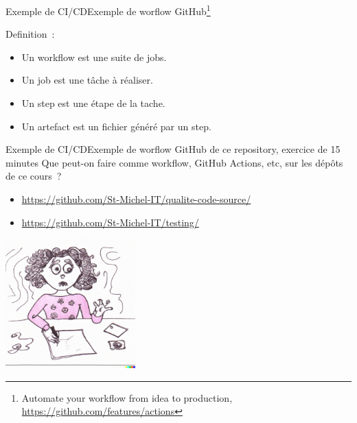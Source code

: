 \documentclass{beamer}
\begin{document}
    \begin{frame}{Exemple de CI/CD}{Exemple de worflow GitHub{\footnote{Automate your workflow from idea to production, \url{https://github.com/features/actions}}}}
        \transdissolve

        Definition~:
        \begin{itemize}
            \item Un workflow est une suite de jobs.
            \item Un job est une tâche à réaliser.
            \item Un step est une étape de la tache.
            \item Un artefact est un fichier généré par un step.
        \end{itemize}
    \end{frame}

    \begin{frame}{Exemple de CI/CD}{Exemple de worflow GitHub de ce repository, exercice de 15 minutes}
        \transdissolve
        Que peut-on faire comme workflow, GitHub Actions, etc, sur les dépôts de ce cours~?
        \begin{itemize}
            \item \url{https://github.com/St-Michel-IT/qualite-code-source/}
            \item \url{https://github.com/St-Michel-IT/testing/}
        \end{itemize}
        \bigbreak
        \centering
        \includegraphics[width=5cm]{image/young-praticing-her-homework}
    \end{frame}
\end{document}
